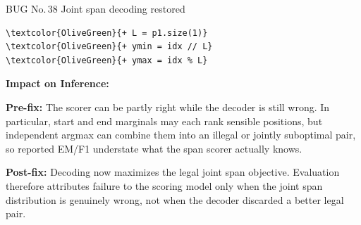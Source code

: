 \documentclass[10pt]{article}
\newcommand{\FieldLabel}[1]{%
 {\bfseries #1:}\par
}
\begin{document}
\begin{bugbox}{BUG No.\,38 \quad Joint span decoding restored}
\begin{Verbatim}[commandchars=\\\{\},fontsize=\footnotesize,breaklines=true,breaksymbol={},frame=leftline,framerule=2pt,rulecolor=\color{gray!40},xleftmargin=6pt,formatcom=\singlespacing]
\textcolor{OliveGreen}{+ L = p1.size(1)}
\textcolor{OliveGreen}{+ ymin = idx // L}
\textcolor{OliveGreen}{+ ymax = idx % L}
\end{Verbatim}
\vspace{0.22em}
\FieldLabel{Impact on Inference}
\textbf{Pre-fix:} The scorer can be partly right while the decoder is still wrong. In particular, start and end marginals may each rank sensible positions, but independent argmax can combine them into an illegal or jointly suboptimal pair, so reported EM/F1 understate what the span scorer actually knows.\par\smallskip
\textbf{Post-fix:} Decoding now maximizes the legal joint span objective. Evaluation therefore attributes failure to the scoring model only when the joint span distribution is genuinely wrong, not when the decoder discarded a better legal pair.
\par
\vspace{0.35em}
\end{bugbox}
\end{document}
